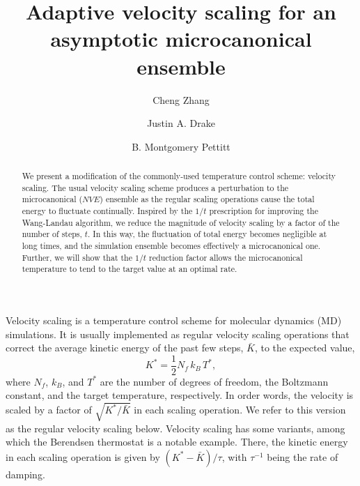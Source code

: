 \documentclass[reprint]{revtex4-1}
\begin{document}
\title{Adaptive velocity scaling for an asymptotic
microcanonical ensemble}

\author{Cheng Zhang}
\author{Justin A. Drake}
\author{B. Montgomery Pettitt}

\begin{abstract}
  We present a modification of the commonly-used
  temperature control scheme: velocity scaling.
  The usual velocity scaling scheme produces a perturbation to
  the microcanonical ($NVE$) ensemble
  as the regular scaling operations cause the total energy to fluctuate continually.
  Inspired by the $1/t$ prescription for improving the Wang-Landau algorithm,
  we reduce
  the magnitude of velocity scaling
  by a factor of the number of steps, $t$.
  In this way,
  the fluctuation of total energy becomes negligible at long times,
  and the simulation ensemble becomes effectively
  a microcanonical one.
  Further, we will show that the $1/t$ reduction factor
  allows the microcanonical temperature to tend to the target value
  at an optimal rate.
\end{abstract}

\maketitle



Velocity scaling is a temperature control scheme
for molecular dynamics (MD) simulations.
%
It is usually implemented as
regular velocity scaling operations
that correct the average
kinetic energy of the past few steps, $\bar K$,
to the expected value\cite{frenkel, haile},
%
\begin{equation}
  K^* = \frac{1}{2} N_f \, k_B \, T^*
  ,
  \label{eq:K_canon}
\end{equation}
%
where $N_f$, $k_B$, and $T^*$ are the number of degrees of freedom,
the Boltzmann constant, and the target temperature, respectively.
%
In order words,
the velocity is scaled by a factor of
$\sqrt{ K^* / \bar K }$
in each scaling operation.
%
We refer to this version as the regular velocity scaling below.
%
Velocity scaling has some variants,
among which
the Berendsen thermostat\cite{berendsen1984}
is a notable example.
%
There,
the kinetic energy in each scaling operation
is given by
$\left( K^* - \bar K \right)/\tau$,
with $\tau^{-1}$ being the rate of damping.
\end{document}
